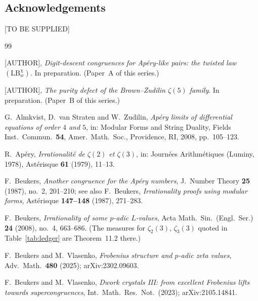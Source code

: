 \documentclass[11pt,reqno]{article}
\theoremstyle{plain}
\theoremstyle{definition}
\theoremstyle{remark}
\numberwithin{equation}{section}
\begin{document}
\subsection*{Acknowledgements}

[TO BE SUPPLIED]

\begin{thebibliography}{99}


[AUTHOR],
\emph{Digit-descent congruences for Ap\'ery-like pairs: the twisted law
$(\mathrm{LB}_w^\chi)$}.
In preparation.  (Paper~A of this series.)

[AUTHOR],
\emph{The purity defect of the Brown--Zudilin $\zeta(5)$ family}.
In preparation.  (Paper~B of this series.)

G.~Almkvist, D.~van Straten and W.~Zudilin,
\emph{Ap\'ery limits of differential equations of order $4$ and $5$},
in: Modular Forms and String Duality, Fields Inst.\ Commun.\ \textbf{54},
Amer.\ Math.\ Soc., Providence, RI, 2008, pp.~105--123.

R.~Ap\'ery,
\emph{Irrationalit\'e de $\zeta(2)$ et $\zeta(3)$},
in: Journ\'ees Arithm\'etiques (Luminy, 1978),
Ast\'erisque \textbf{61} (1979), 11--13.

F.~Beukers,
\emph{Another congruence for the Ap\'ery numbers},
J.\ Number Theory \textbf{25} (1987), no.~2, 201--210;
see also F.~Beukers, \emph{Irrationality proofs using modular forms},
Ast\'erisque \textbf{147--148} (1987), 271--283.

F.~Beukers,
\emph{Irrationality of some $p$-adic $L$-values},
Acta Math.\ Sin.\ (Engl.\ Ser.) \textbf{24} (2008), no.~4, 663--686.
(The measures for $\zeta_2(3)$, $\zeta_3(3)$ quoted in
Table~\ref{tab:ledger} are Theorem~11.2 there.)

F.~Beukers and M.~Vlasenko,
\emph{Frobenius structure and $p$-adic zeta values},
Adv.\ Math.\ \textbf{480} (2025); arXiv:2302.09603.

F.~Beukers and M.~Vlasenko,
\emph{Dwork crystals III: from excellent Frobenius lifts towards
supercongruences},
Int.\ Math.\ Res.\ Not.\ (2023); arXiv:2105.14841.


\end{thebibliography}
\end{document}
